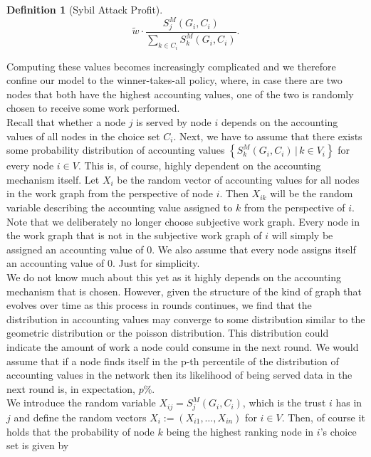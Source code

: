 \documentclass[11pt,a4paper]{report}
\theoremstyle{definition}
\newtheorem{definition}{Definition}[section]
\theoremstyle{theorem}
\theoremstyle{proposition}
\theoremstyle{corollary}
\theoremstyle{lemma}
\theoremstyle{example}
\theoremstyle{remark}
\begin{document}
\begin{definition}[Sybil Attack Profit]
\[
\tilde{w}\cdot\frac{S^M_j(G_i,C_i)}{\sum\limits_{k\in{}C_i}^{}S^M_k(G_i,C_i)}.
\]

\noindent{}Computing these values becomes increasingly complicated and we therefore confine our model to the winner-takes-all policy, where, in case there are two nodes that both have the highest accounting values, one of the two is randomly chosen to receive some work performed. \vspace{1em}\\

\noindent{}Recall that whether a node $j$ is served by node $i$ depends on the accounting values of all nodes in the choice set $C_i$. Next, we have to assume that there exists some probability distribution of accounting values $\left\lbrace{}S^M_k(G_i,C_i)\,|\,k\in{}V_i\right\rbrace$ for every node $i\in{}V$. This is, of course, highly dependent on the accounting mechanism itself. Let $X_i$ be the random vector of accounting values for all nodes in the work graph from the perspective of node $i$. Then $X_{ik}$ will be the random variable describing the accounting value assigned to $k$ from the perspective of $i$. Note that we deliberately no longer choose subjective work graph. Every node in the work graph that is not in the subjective work graph of $i$ will simply be assigned an accounting value of 0. We also assume that every node assigns itself an accounting value of 0. Just for simplicity. \vspace{1em}\\ 

\noindent{}We do not know much about this yet as it highly depends on the accounting mechanism that is chosen. However, given the structure of the kind of graph that evolves over time as this process in rounds continues, we find that the distribution in accounting values may converge to some distribution similar to the geometric distribution or the poisson distribution. This distribution could indicate the amount of work a node could consume in the next round. We would assume that if a node finds itself in the p-th percentile of the distribution of accounting values in the network then its likelihood of being served data in the next round is, in expectation, $p\%$. \vspace{1em}\\

\noindent{}We introduce the random variable $X_{ij}=S^M_j(G_i,C_i)$, which is the trust $i$ has in $j$ and define the random vectors $X_i:=(X_{i1},\ldots,X_{in})$ for $i\in{}V$. Then, of course it holds that the probability of node $k$ being the highest ranking node in $i$'s choice set is given by 


\end{definition}
\end{document}
